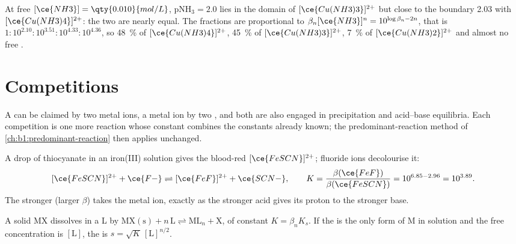 \begin{example}\label{ex:b1:complexation:cu}
At free $[\ce{NH3}] = \qty{0.010}{mol/L}$, $\mathrm{pNH_3} = 2.0$ lies in
the domain of $[\ce{Cu(NH3)3}]^{2+}$ but close to the boundary 2.03 with
$[\ce{Cu(NH3)4}]^{2+}$: the two are nearly equal. The fractions are
proportional to $\beta_n[\ce{NH3}]^n = 10^{\log\beta_n - 2n}$, that is
$1 : 10^{2.10} : 10^{3.51} : 10^{4.33} : 10^{4.36}$, so \qty{48}{\percent} of
$[\ce{Cu(NH3)4}]^{2+}$, \qty{45}{\percent} of $[\ce{Cu(NH3)3}]^{2+}$,
\qty{7}{\percent} of $[\ce{Cu(NH3)2}]^{2+}$ and almost no free .
\end{example}

\section{Competitions}

A  can be claimed by two metal ions, a metal ion by two ,
and both are also engaged in precipitation and acid--base equilibria.
Each competition is one more reaction whose constant combines the
constants already known; the predominant-reaction method of
\cref{ch:b1:predominant-reaction} then applies unchanged.

\begin{example}\label{ex:b1:complexation:scn-f}
A drop of thiocyanate in an iron(III) solution gives the blood-red
$[\ce{FeSCN}]^{2+}$; fluoride ions decolourise it:
\[
  [\ce{FeSCN}]^{2+} + \ce{F-} \rightleftharpoons [\ce{FeF}]^{2+} + \ce{SCN-},
  \qquad K = \frac{\beta(\ce{FeF})}{\beta(\ce{FeSCN})} = 10^{6.85 - 2.96} =
  10^{3.89} .
\]
The stronger  (larger $\beta$) takes the metal ion, exactly as the
stronger acid gives its proton to the stronger base.
\end{example}

\begin{proposition}\label{prop:b1:complexation:competition-precipitation}
A solid MX dissolves in a  L by
$\mathrm{MX(s)} + n\,\mathrm{L} \rightleftharpoons \mathrm{ML}_n + \mathrm{X}$,
of constant $K = \beta_n K_s$. If the  is the only form of M in
solution and the free  concentration is $[\mathrm{L}]$, the
 is $s = \sqrt{K}\,[\mathrm{L}]^{n/2}$.
\end{proposition}

